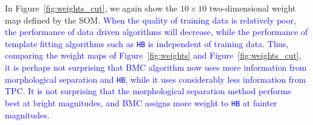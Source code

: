 \documentclass[useAMS,usenatbib]{mn2e}
\begin{document}
In Figure~\ref{fig:weights_cut}, we again show the $10\times10$
two-dimensional weight map defined by the SOM.
\textcolor{blue}{When the quality of training data is relatively poor,
the performance of data driven algorithms will decrease,
while the performance of template fitting algorithms such as \texttt{HB}
is independent of training data.
Thus, comparing the weight maps of Figure~\ref{fig:weights}
and Figure~\ref{fig:weights_cut},
it is perhaps not surprising that
BMC algorithm now uses more information from
morphological separation and \texttt{HB},
while it uses considerably less information from TPC.
It is not surprising that the morphological separation method
performs best at bright magnitudes,
and BMC assigns more weight to \texttt{HB} at fainter magnitudes.}
\end{document}

